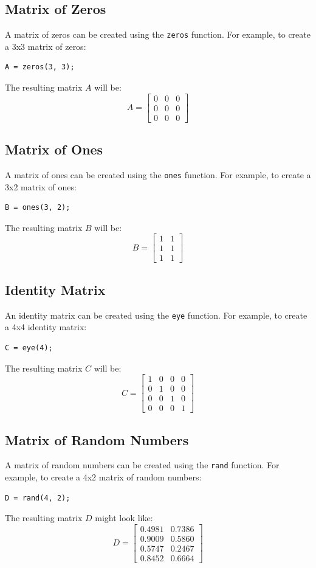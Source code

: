 \documentclass[a4paper,12pt]{article}
\begin{document}
\subsection*{Matrix of Zeros}
A matrix of zeros can be created using the \texttt{zeros} function. For example, to create a 3x3 matrix of zeros:
\begin{lstlisting}[style=vscode-light]
	A = zeros(3, 3);
\end{lstlisting}
The resulting matrix \( A \) will be:
\[
A = \begin{bmatrix}
	0 & 0 & 0 \\
	0 & 0 & 0 \\
	0 & 0 & 0
\end{bmatrix}
\]

\subsection*{Matrix of Ones}
A matrix of ones can be created using the \texttt{ones} function. For example, to create a 3x2 matrix of ones:
\begin{lstlisting}[style=vscode-light]
	B = ones(3, 2);
\end{lstlisting}
The resulting matrix \( B \) will be:
\[
B = \begin{bmatrix}
	1 & 1 \\
	1 & 1 \\
	1 & 1
\end{bmatrix}
\]

\subsection*{Identity Matrix}
An identity matrix can be created using the \texttt{eye} function. For example, to create a 4x4 identity matrix:
\begin{lstlisting}[style=vscode-light]
	C = eye(4);
\end{lstlisting}
The resulting matrix \( C \) will be:
\[
C = \begin{bmatrix}
	1 & 0 & 0 & 0 \\
	0 & 1 & 0 & 0 \\
	0 & 0 & 1 & 0 \\
	0 & 0 & 0 & 1
\end{bmatrix}
\]

\subsection*{Matrix of Random Numbers}
A matrix of random numbers can be created using the \texttt{rand} function. For example, to create a 4x2 matrix of random numbers:
\begin{lstlisting}[style=vscode-light]
	D = rand(4, 2);
\end{lstlisting}
The resulting matrix \( D \) might look like:
\[
D = \begin{bmatrix}
	0.4981 & 0.7386 \\
	0.9009 & 0.5860 \\
	0.5747 & 0.2467 \\
	0.8452 & 0.6664
\end{bmatrix}
\]
\end{document}
